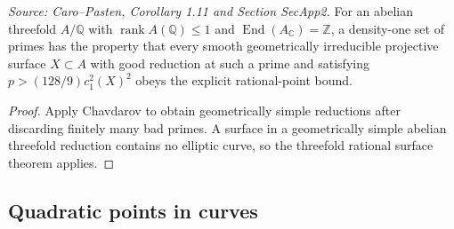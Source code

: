 \begin{corollary}
  \label{cor:cp_dim3_density_application}
  \textit{Source: Caro--Pasten, Corollary 1.11 and Section SecApp2.}
  For an abelian threefold \(A/\mathbb Q\) with
  \(\operatorname{rank}A(\mathbb Q)\le1\) and
  \(\operatorname{End}(A_\mathbb C)=\mathbb Z\), a density-one set of primes
  has the property that every smooth geometrically irreducible projective
  surface \(X\subset A\) with good reduction at such a prime and satisfying
  \(p>(128/9)c_1^2(X)^2\) obeys the explicit rational-point bound.
\end{corollary}
\begin{proof}
  Apply Chavdarov to obtain geometrically simple reductions after discarding
  finitely many bad primes.  A surface in a geometrically simple abelian
  threefold reduction contains no elliptic curve, so the threefold rational
  surface theorem applies.
\end{proof}

\subsection{Quadratic points in curves}

